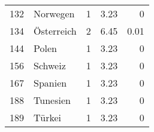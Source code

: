 \begin{longtable}{lXrrr}
     132 &
     \multicolumn{1}{X}{ Norwegen   } &


       \num{1} &
       \num[round-mode=places,round-precision=2]{3,23} &
         \num[round-mode=places,round-precision=2]{0} \\

     134 &
     \multicolumn{1}{X}{ Österreich   } &


       \num{2} &
       \num[round-mode=places,round-precision=2]{6,45} &
         \num[round-mode=places,round-precision=2]{0,01} \\

     144 &
     \multicolumn{1}{X}{ Polen   } &


       \num{1} &
       \num[round-mode=places,round-precision=2]{3,23} &
         \num[round-mode=places,round-precision=2]{0} \\

     156 &
     \multicolumn{1}{X}{ Schweiz   } &


       \num{1} &
       \num[round-mode=places,round-precision=2]{3,23} &
         \num[round-mode=places,round-precision=2]{0} \\

     167 &
     \multicolumn{1}{X}{ Spanien   } &


       \num{1} &
       \num[round-mode=places,round-precision=2]{3,23} &
         \num[round-mode=places,round-precision=2]{0} \\

     188 &
     \multicolumn{1}{X}{ Tunesien   } &


       \num{1} &
       \num[round-mode=places,round-precision=2]{3,23} &
         \num[round-mode=places,round-precision=2]{0} \\

     189 &
     \multicolumn{1}{X}{ Türkei   } &


       \num{1} &
       \num[round-mode=places,round-precision=2]{3,23} &
         \num[round-mode=places,round-precision=2]{0} \\


\end{longtable}
